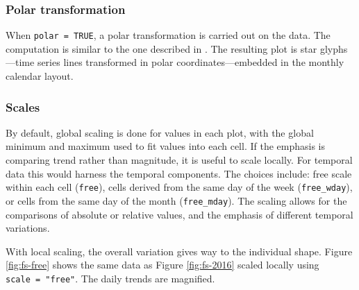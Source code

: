 \documentclass[12pt]{article}
\begin{document}
\hypertarget{polar-transformation}{%
\subsubsection{Polar transformation}\label{polar-transformation}}

When \texttt{polar\ =\ TRUE}, a polar transformation is carried out on the data. The computation is similar to the one described in \citet{Wickham2012glyph}. The resulting plot is star glyphs---time series lines transformed in polar coordinates---embedded in the monthly calendar layout.



\hypertarget{scales}{%
\subsubsection{Scales}\label{scales}}

By default, global scaling is done for values in each plot, with the global minimum and maximum used to fit values into each cell. If the emphasis is comparing trend rather than magnitude, it is useful to scale locally. For temporal data this would harness the temporal components. The choices include: free scale within each cell (\texttt{free}), cells derived from the same day of the week (\texttt{free\_wday}), or cells from the same day of the month (\texttt{free\_mday}). The scaling allows for the comparisons of absolute or relative values, and the emphasis of different temporal variations.

With local scaling, the overall variation gives way to the individual shape. Figure \ref{fig:fs-free} shows the same data as Figure \ref{fig:fs-2016} scaled locally using \texttt{scale\ =\ "free"}. The daily trends are magnified.
\end{document}
